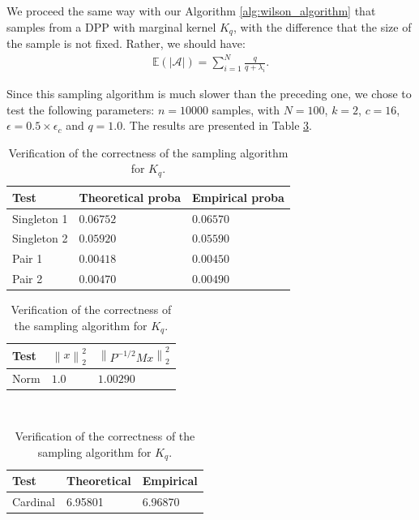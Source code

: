 \documentclass{article}
\newcommand{\abs} [1] {\left| #1 \right|}
\newcommand{\norm}[1]{\left\|#1\right\|}
\begin{document}
We proceed the same way with our Algorithm \ref{alg:wilson_algorithm} that samples from a DPP with marginal kernel $K_q$, with the difference that the size of the sample is not fixed. Rather, we should have:
\begin{align} \mathbb{E}\left( \abs{\mathcal{A}}\right) = \sum_{i=1}^{N} \frac{q}{q+\lambda_i}. \end{align}


Since this sampling algorithm is much slower than the preceding one, we chose to test the following parameters: $n=10000$ samples, with $N=100$, $k=2$, $c=16$, $\epsilon = 0.5 \times \epsilon_c$ and $q=1.0$. The results are presented in Table \ref{tab:Kq:verification}.

\begin{table}[th]
  \caption{Verification of the correctness of the sampling algorithm for $K_q$.}
  \label{tab:Kq:verification}
  \centering
  \begin{tabular}{lll}
    \toprule
    Test &  Theoretical proba & Empirical proba \\
    \midrule
    Singleton 1 & $0.06752$ & $0.06570$ \\
    Singleton 2 & $0.05920$ & $0.05590$ \\
    Pair 1 & $0.00418$ & $0.00450$ \\
		Pair 2 & $0.00470$ & $0.00490$ \\
    \bottomrule
  \end{tabular}
	\quad
	\begin{tabular}{lll}
    \toprule
    Test &  $\norm{x}_2^2$ & $\norm{P^{-1/2} M x}_2^2$ \\
    \midrule
    Norm & $1.0$ & $1.00290$ \\
    \bottomrule
  \end{tabular} \\
	\vspace{0.5cm}
	\begin{tabular}{lll}
    \toprule
    Test &  Theoretical & Empirical \\
    \midrule
    Cardinal & 6.95801 & 6.96870 \\
    \bottomrule
  \end{tabular}
\end{table}
		
\end{document}
